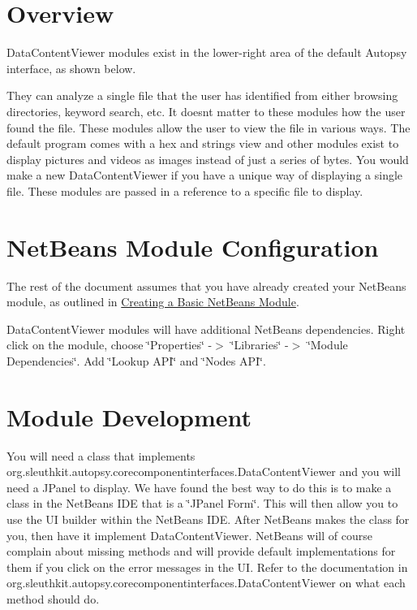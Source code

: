 \hypertarget{mod_content_page_content_overview}{}\section{Overview}\label{mod_content_page_content_overview}
Data\+Content\+Viewer modules exist in the lower-\/right area of the default Autopsy interface, as shown below.



They can analyze a single file that the user has identified from either browsing directories, keyword search, etc. It doesn\textquotesingle{}t matter to these modules how the user found the file. These modules allow the user to view the file in various ways. The default program comes with a hex and strings view and other modules exist to display pictures and videos as images instead of just a series of bytes. You would make a new Data\+Content\+Viewer if you have a unique way of displaying a single file. These modules are passed in a reference to a specific file to display.\hypertarget{mod_content_page_content_nb}{}\section{Net\+Beans Module Configuration}\label{mod_content_page_content_nb}
The rest of the document assumes that you have already created your Net\+Beans module, as outlined in \hyperlink{mod_dev_page_mod_dev_module}{Creating a Basic Net\+Beans Module}.

Data\+Content\+Viewer modules will have additional Net\+Beans dependencies. Right click on the module, choose \char`\"{}\+Properties\char`\"{} -\/$>$ \char`\"{}\+Libraries\char`\"{} -\/$>$ \char`\"{}\+Module Dependencies\char`\"{}. Add \char`\"{}\+Lookup A\+P\+I\char`\"{} and \char`\"{}\+Nodes A\+P\+I\char`\"{}.\hypertarget{mod_content_page_content_mod}{}\section{Module Development}\label{mod_content_page_content_mod}
You will need a class that implements org.\+sleuthkit.\+autopsy.\+corecomponentinterfaces.\+Data\+Content\+Viewer and you will need a J\+Panel to display. We have found the best way to do this is to make a class in the Net\+Beans I\+DE that is a \char`\"{}\+J\+Panel Form\char`\"{}. This will then allow you to use the UI builder within the Net\+Beans I\+DE. After Net\+Beans makes the class for you, then have it implement Data\+Content\+Viewer. Net\+Beans will of course complain about missing methods and will provide default implementations for them if you click on the error messages in the UI. Refer to the documentation in org.\+sleuthkit.\+autopsy.\+corecomponentinterfaces.\+Data\+Content\+Viewer on what each method should do.

